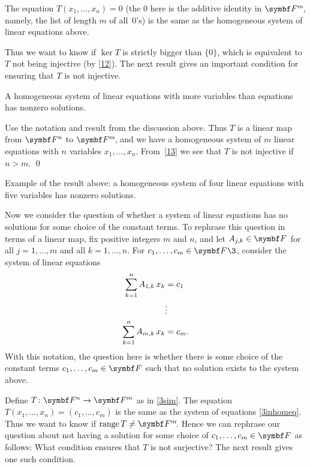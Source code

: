 The equation $T(x_1, \dots, x_n) = 0$ (the $0$ here is the
additive identity in $\FF{m}$, namely, the list of length $m$ of all~$0$'s) is the same as the homogeneous system of linear equations above.

Thus we want to know if $\ker T$ is strictly bigger than $\{0\}$, which is equivalent to $T$ not being injective (by \ref{12}). The next result gives an important condition for ensuring that $T$ is not injective.

{A homogeneous system of linear equations with more variables than equations has nonzero solutions.}

\proof
Use the notation and result from the discussion above. Thus $T$ is a linear map from $\F{n}$ to $\FF{m}$, and we have a homogeneous system of $m$ linear equations with $n$ variables $x_1, \dots, x_n$. From~\ref{13} we see that $T$ is not injective if
$n > m$.
\qed

Example of the result above: a homogeneous system of four linear equations with five variables has nonzero solutions.

Now we consider the question of whether a system of linear equations has no solutions for some choice of the constant terms. To rephrase this question in terms of a linear map, fix positive integers $m$ and $n$, and let
$A_{j,k} \in \F{}$ for all $j = 1, \dots, m$ and all \mbox{$k = 1, \dots , n$}. For $c_1, \dots, c_m \in \F{}\3$, consider the system of linear equations
\begin{align}
\sum_{k=1}^n A_{1,k} \, x_k &= c_1 \notag\\
& \vdots \label{3inhomeq}\\
\sum_{k=1}^n A_{m,k} \, x_k &= c_m. \notag
\end{align}
With this notation, the question here is whether there is some choice of the constant terms $c_1, \dots, c_m \in \F{}$ such that no solution exists to the system above.


Define $T\colon \F{n}  \rightarrow \F{m}$ as in \ref{3sim}.
The equation
$
T(x_1, \dots, x_n) \!= \!(c_1, \dots, c_m)
$
is the same as the system of equations \ref{3inhomeq}.
Thus we want to know if $\ran T \ne \FF{m}$. Hence  we can rephrase our question about not having a solution for some choice of $c_1, \dots, c_m \in \F{}$ as follows: What condition ensures that $T$ is not surjective? The next result gives one such condition.

